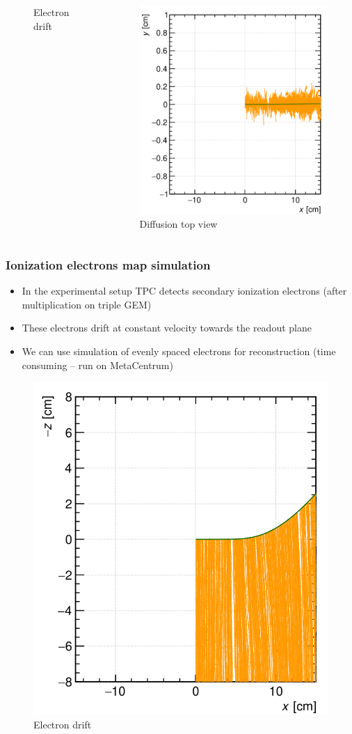 \documentclass{beamer}
\begin{document}
\begin{frame}
\begin{columns}
\begin{figure}
				\caption{Electron drift}
			\end{figure}
			\begin{figure}
				\centering
				\includegraphics[width = 0.95 \linewidth]{../images/track3.png}
				\caption{Diffusion top view}
			\end{figure}
		\end{columns}
	\end{frame}
	
	\begin{frame}
		\frametitle{Ionization electrons map simulation}
		\begin{itemize}
			\item In the experimental setup TPC detects secondary ionization electrons (after multiplication on triple GEM)
			\item These electrons drift at constant velocity towards the readout plane
			\item We can use simulation of evenly spaced electrons for reconstruction (time consuming -- run on MetaCentrum)
		\end{itemize}
		\begin{figure}
			\centering
			\includegraphics[width = 0.3 \linewidth]{../images/track2.png}
			\caption{Electron drift}
		\end{figure}
	\end{frame}
	
\end{document}
